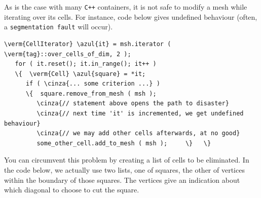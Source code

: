 As is the case with many {\tt C++} containers, it is not safe to modify a mesh while
iterating over its cells.
For instance, code below gives undefined behaviour (often, a {\small\tt segmentation fault}
will occur).

\begin{Verbatim}[commandchars=\\\{\},formatcom=\small\tt,frame=single,
   label=incorrect code !,rulecolor=\color{coment},
   baselinestretch=0.94,framesep=2mm]
   \verm{CellIterator} \azul{it} = msh.iterator ( \verm{tag}::over_cells_of_dim, 2 );
   for ( it.reset(); it.in_range(); it++ )
   \{  \verm{Cell} \azul{square} = *it;
      if ( \cinza{... some criterion ...} )
      \{  square.remove_from_mesh ( msh );
         \cinza{// statement above opens the path to disaster}
         \cinza{// next time 'it' is incremented, we get undefined behaviour}
         \cinza{// we may add other cells afterwards, at no good}
         some_other_cell.add_to_mesh ( msh );     \}   \}
\end{Verbatim}

You can circumvent this problem by creating a list of cells to be eliminated.
In the code below, we actually use two lists, one of squares, the other of vertices within
the boundary of those squares.
The vertices give an indication about which diagonal to choose to cut the square.

